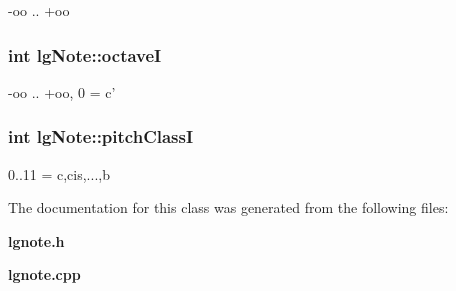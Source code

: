 -oo .. +oo 

\subsubsection{\setlength{\rightskip}{0pt plus 5cm}int {\bf lg\-Note::octave\-I}\hspace{0.3cm}{\tt  [private]}}\label{classlgNote_r1}


-oo .. +oo, 0 = c' 

\subsubsection{\setlength{\rightskip}{0pt plus 5cm}int {\bf lg\-Note::pitch\-Class\-I}\hspace{0.3cm}{\tt  [private]}}\label{classlgNote_r0}


0..11 = c,cis,...,b 



The documentation for this class was generated from the following files:\begin{CompactItemize}
\item 
{\bf lgnote.h}\item 
{\bf lgnote.cpp}\end{CompactItemize}
